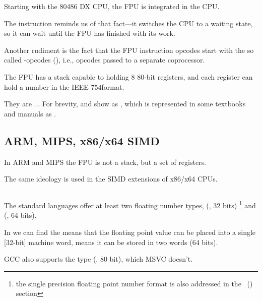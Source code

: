 Starting with the 80486 DX CPU, the \ac{FPU} is integrated in the \ac{CPU}.

The  instruction reminds us of that fact---it switches the \ac{CPU} to a waiting state, so it can wait until the \ac{FPU} has finished with its work.

Another rudiment is the fact that the \ac{FPU} instruction 
opcodes start with the so called -opcodes (), i.e., 
opcodes passed to a separate coprocessor.

\label{FPU_is_stack}

The FPU has a stack capable to holding 8 80-bit registers, and each register can hold a number 
in the IEEE 754\FNURLIEEE format.

They are ... For brevity, \IDA and \olly show  as , 
which is represented in some textbooks and manuals as .

\subsection{ARM, MIPS, x86/x64 SIMD}

In ARM and MIPS the FPU is not a stack, but a set of registers.

The same ideology is used in the SIMD extensions of x86/x64 CPUs.

\subsection{\CCpp}


The standard \CCpp languages offer at least two floating number types, \Tfloat (\FNURLSP, 32 bits)
\footnote{the single precision floating point number format is also addressed in 
the \IT{\WorkingWithFloatAsWithStructSubSubSectionName}~() section}
and \Tdouble (\FNURLDP, 64 bits).

In  we can find the  means that the floating point value can be placed into a single
[32-bit] machine word,  means it can be stored in two words (64 bits).


GCC also supports the  type (\FNURLEP, 80 bit), which MSVC doesn't.

